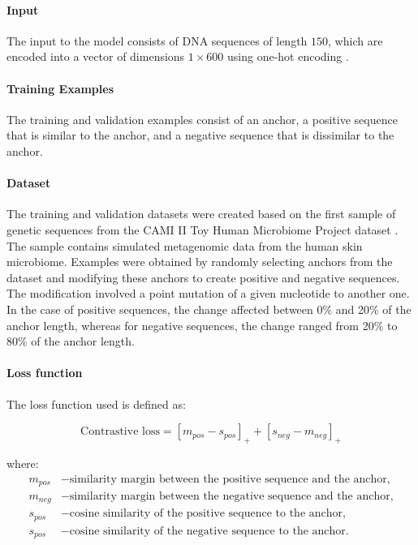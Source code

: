 \documentclass[pdflatex,sn-vancouver-num]{sn-jnl}%
\begin{document}
                \paragraph{Input}
                The input to the model consists of DNA sequences of length $150$, which are encoded into a vector of dimensions $1 \times 600$ using one-hot encoding \cite{HarrisDavid:2007}.

                \paragraph{Training Examples}
                The training and validation examples consist of an anchor, a positive sequence that is similar to the anchor, and a negative sequence that is dissimilar to the anchor.

                \paragraph{Dataset}
                The training and validation datasets were created based on the first sample of genetic sequences from the CAMI II Toy Human Microbiome Project dataset \cite{Fritz:2019}. The sample contains simulated metagenomic data from the human skin microbiome. Examples were obtained by randomly selecting anchors from the dataset and modifying these anchors to create positive and negative sequences. The modification involved a point mutation of a given nucleotide to another one. In the case of positive sequences, the change affected between 0\% and 20\% of the anchor length, whereas for negative sequences, the change ranged from 20\% to 80\% of the anchor length.

                \paragraph{Loss function}
                The loss function used is defined as:

                \begin{equation}
                    \text{Contrastive loss} = [m_{pos} - s_{pos}]_{+} + [s_{neg} - m_{neg}]_{+}
                \end{equation}

                where:
                \begin{align*}
                    m_{pos} &- \text{similarity margin between the positive sequence and the anchor,} \\
                    m_{neg} &- \text{similarity margin between the negative sequence and the anchor,} \\
                    s_{pos} &- \text{cosine similarity of the positive sequence to the anchor,} \\
                    s_{pos} &- \text{cosine similarity of the negative sequence to the anchor.} \\
                \end{align*}
                
\end{document}
